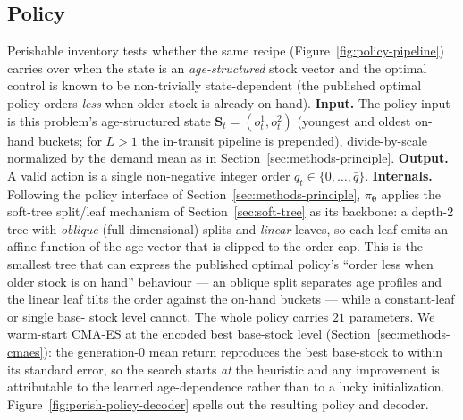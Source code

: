 \documentclass[11pt]{article}
\newcommand{\btheta}{\boldsymbol{\theta}}
\begin{document}
\FloatBarrier

\subsection{Policy}
\label{sec:perishable-policy}

Perishable inventory tests whether the same recipe (Figure~\ref{fig:policy-pipeline}) carries over
when the state is an \emph{age-structured} stock vector and the optimal control is known to be
non-trivially state-dependent (the published optimal policy orders \emph{less} when older stock is
already on hand). \textbf{Input.} The policy input is this problem's age-structured state
$\mathbf S_t=(o^{1}_t,o^{2}_t)$ (youngest and oldest on-hand buckets; for $L>1$ the in-transit
pipeline is prepended), divide-by-scale normalized by the demand mean as in
Section~\ref{sec:methods-principle}. \textbf{Output.} A valid action is a single non-negative integer
order $q_t\in\{0,\dots,\bar q\}$. \textbf{Internals.} Following the policy interface of
Section~\ref{sec:methods-principle}, $\pi_{\btheta}$ applies the soft-tree split/leaf mechanism of
Section~\ref{sec:soft-tree} as its backbone: a depth-2 tree with \emph{oblique} (full-dimensional)
splits and \emph{linear} leaves, so each leaf emits an affine function of the age vector that is
clipped to the order cap. This is the smallest tree that can express the published optimal policy's
``order less when older stock is on hand'' behaviour --- an oblique split separates age profiles and
the linear leaf tilts the order against the on-hand buckets --- while a constant-leaf or single base-
stock level cannot. The whole policy carries $21$ parameters. We warm-start CMA-ES at the encoded
best base-stock level (Section~\ref{sec:methods-cmaes}): the generation-0 mean return reproduces the
best base-stock to within its standard error, so the search starts \emph{at} the heuristic and any
improvement is attributable to the learned age-dependence rather than to a lucky initialization.
Figure~\ref{fig:perish-policy-decoder} spells out the resulting policy and decoder.
\end{document}
